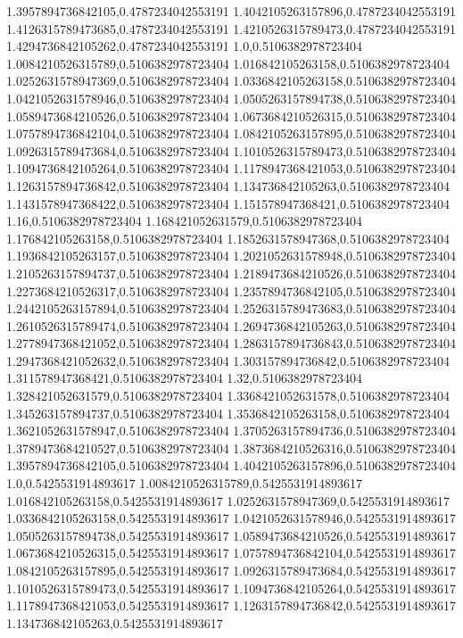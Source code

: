 1.3957894736842105,0.4787234042553191
1.4042105263157896,0.4787234042553191
1.4126315789473685,0.4787234042553191
1.4210526315789473,0.4787234042553191
1.4294736842105262,0.4787234042553191
1.0,0.5106382978723404
1.0084210526315789,0.5106382978723404
1.016842105263158,0.5106382978723404
1.0252631578947369,0.5106382978723404
1.0336842105263158,0.5106382978723404
1.0421052631578946,0.5106382978723404
1.0505263157894738,0.5106382978723404
1.0589473684210526,0.5106382978723404
1.0673684210526315,0.5106382978723404
1.0757894736842104,0.5106382978723404
1.0842105263157895,0.5106382978723404
1.0926315789473684,0.5106382978723404
1.1010526315789473,0.5106382978723404
1.1094736842105264,0.5106382978723404
1.1178947368421053,0.5106382978723404
1.1263157894736842,0.5106382978723404
1.134736842105263,0.5106382978723404
1.1431578947368422,0.5106382978723404
1.151578947368421,0.5106382978723404
1.16,0.5106382978723404
1.168421052631579,0.5106382978723404
1.176842105263158,0.5106382978723404
1.1852631578947368,0.5106382978723404
1.1936842105263157,0.5106382978723404
1.2021052631578948,0.5106382978723404
1.2105263157894737,0.5106382978723404
1.2189473684210526,0.5106382978723404
1.2273684210526317,0.5106382978723404
1.2357894736842105,0.5106382978723404
1.2442105263157894,0.5106382978723404
1.2526315789473683,0.5106382978723404
1.2610526315789474,0.5106382978723404
1.2694736842105263,0.5106382978723404
1.2778947368421052,0.5106382978723404
1.2863157894736843,0.5106382978723404
1.2947368421052632,0.5106382978723404
1.303157894736842,0.5106382978723404
1.311578947368421,0.5106382978723404
1.32,0.5106382978723404
1.328421052631579,0.5106382978723404
1.3368421052631578,0.5106382978723404
1.345263157894737,0.5106382978723404
1.3536842105263158,0.5106382978723404
1.3621052631578947,0.5106382978723404
1.3705263157894736,0.5106382978723404
1.3789473684210527,0.5106382978723404
1.3873684210526316,0.5106382978723404
1.3957894736842105,0.5106382978723404
1.4042105263157896,0.5106382978723404
1.0,0.5425531914893617
1.0084210526315789,0.5425531914893617
1.016842105263158,0.5425531914893617
1.0252631578947369,0.5425531914893617
1.0336842105263158,0.5425531914893617
1.0421052631578946,0.5425531914893617
1.0505263157894738,0.5425531914893617
1.0589473684210526,0.5425531914893617
1.0673684210526315,0.5425531914893617
1.0757894736842104,0.5425531914893617
1.0842105263157895,0.5425531914893617
1.0926315789473684,0.5425531914893617
1.1010526315789473,0.5425531914893617
1.1094736842105264,0.5425531914893617
1.1178947368421053,0.5425531914893617
1.1263157894736842,0.5425531914893617
1.134736842105263,0.5425531914893617
